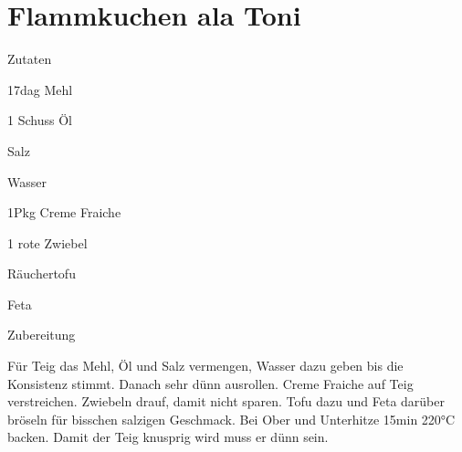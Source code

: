 \chapter*{Flammkuchen ala Toni}
\begin{multicols}{2}
 {\Large Zutaten}
 \begin{Zutaten}
		\item 17dag Mehl
		\item 1 Schuss Öl
		\item Salz
		\item Wasser
		\item 1Pkg Creme Fraiche
		\item 1 rote Zwiebel
		\item Räuchertofu
		\item Feta
				
\end{Zutaten}
	
\columnbreak
\end{multicols}

{\Large Zubereitung} \newline
\begin{addmargin}[1cm]{0cm}
	Für Teig das Mehl, Öl und Salz vermengen, Wasser dazu geben bis die Konsistenz stimmt.\newline
	Danach sehr dünn ausrollen.\newline
	Creme Fraiche auf Teig verstreichen. Zwiebeln drauf, damit nicht sparen.
	Tofu dazu und Feta darüber bröseln für bisschen salzigen Geschmack.\newline
	Bei Ober und Unterhitze 15min 220°C backen.\newline
	Damit der Teig knusprig wird muss er dünn sein.
	
	
	
\end{addmargin}
